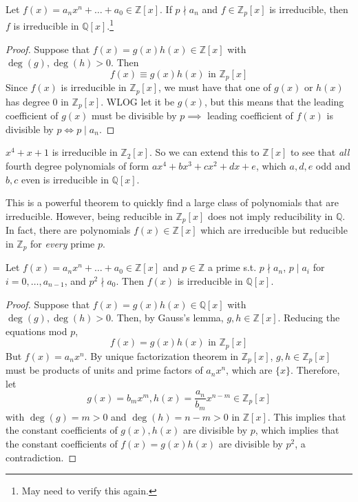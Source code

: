   \begin{theorem}
    Let $f(x) = a_n x^n + \ldots + a_0 \in \mathbb{Z}[x]$. If $p \nmid a_n$ and $f \in \mathbb{Z}_p [x]$ is irreducible, then $f$ is irreducible in $\mathbb{Q}[x]$.\footnote{May need to verify this again.}
  \end{theorem}
  \begin{proof}
    Suppose that $f(x) = g(x) h(x) \in \mathbb{Z}[x]$ with $\deg(g), \deg(h) > 0$. Then 
    \begin{equation}
      f(x) \equiv g(x) h(x) \text{ in } \mathbb{Z}_p [x]
    \end{equation}
    Since $f(x)$ is irreducible in $\mathbb{Z}_p [x]$, we must have that one of $g(x)$ or $h(x)$ has degree $0$ in $\mathbb{Z}_p [x]$. WLOG let it be $g(x)$, but this means that the leading coefficient of $g(x)$ must be divisible by $p \implies$ leading coefficient of $f(x)$ is divisible by $p \iff p \mid a_n$. 
  \end{proof}

  \begin{example}
    $x^4 + x + 1$ is irreducible in $\mathbb{Z}_2 [x]$. So we can extend this to $\mathbb{Z}[x]$ to see that \textit{all} fourth degree polynomials of form $a x^4 + b x^3 + c x^2 + dx + e$, which $a, d, e$ odd and $b, c$ even is irreducible in $\mathbb{Q}[x]$. 
  \end{example}

  This is a powerful theorem to quickly find a large class of polynomials that are irreducible. However, being reducible in $\mathbb{Z}_p [x]$ does not imply reducibility in $\mathbb{Q}$. In fact, there are polynomials $f(x) \in \mathbb{Z}[x]$ which are irreducible but reducible in $\mathbb{Z}_p$ for \textit{every} prime $p$. 

  \begin{theorem}
    Let $f(x) = a_n x^n + \ldots + a_0 \in \mathbb{Z}[x]$ and $p \in \mathbb{Z}$ a prime s.t. $p \nmid a_n$, $p \mid a_i$ for $i = 0, \ldots, a_{n-1}$, and $p^2 \nmid a_0$. Then $f(x)$ is irreducible in $\mathbb{Q}[x]$. 
  \end{theorem}
  \begin{proof}
    Suppose that $f(x) = g(x) h(x) \in \mathbb{Q}[x]$ with $\deg(g), \deg(h) > 0$. Then, by Gauss's lemma, $g, h \in \mathbb{Z}[x]$. Reducing the equations mod $p$, 
    \begin{equation}
      f(x) = g(x) h(x) \text{ in } \mathbb{Z}_p [x]
    \end{equation}
    But $f(x) = a_n x^n$. By unique factorization theorem in $\mathbb{Z}_p [x]$, $g, h \in \mathbb{Z}_p [x]$ must be products of units and prime factors of $a_n x^n$, which are $\{x\}$. Therefore, let 
    \begin{equation}
      g(x) = b_m x^m, h(x) = \frac{a_n}{b_m} x^{n-m} \in \mathbb{Z}_p [x]
    \end{equation}
    with $\deg(g) = m > 0$ and $\deg(h) = n - m > 0$ in $\mathbb{Z}[x]$. This implies that the constant coefficients of $g(x), h(x)$ are divisible by $p$, which implies that the constant coefficients of $f(x) = g(x) h(x)$ are divisible by $p^2$, a contradiction. 
  \end{proof}

